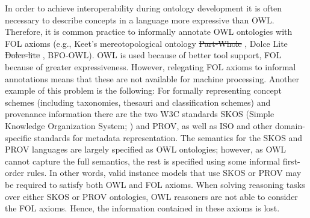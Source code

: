 \documentclass[10pt,fleqn,final]{scrreprt}
\newcommand{\noterefname}{note}
\newcommand{\nref}[1]{\noterefname~\ref{#1}}
\renewcommand{\nref}[1]{\ref{nref-#1}} %
\providecommand{\DIFadd}[1]{{\protect\color{blue}\uwave{#1}}} %
\providecommand{\DIFdel}[1]{{\protect\color{red}\sout{#1}}}                      %
\providecommand{\DIFaddbegin}{} %
\providecommand{\DIFaddend}{} %
\providecommand{\DIFdelbegin}{} %
\providecommand{\DIFdelend}{} %
\begin{document}
In order to achieve interoperability during ontology development it is often necessary to describe 
concepts in a language more expressive than OWL.  Therefore, it is common practice to informally 
annotate OWL ontologies with FOL axioms (e.g., Keet's mereotopological ontology \DIFdelbegin %
\DIFdel{Part-Whole}%
\DIFdelend \DIFaddbegin \DIFadd{\mbox{%
\cite{KeetEtAl12}
}%
}\DIFaddend , 
Dolce Lite \DIFdelbegin %
\DIFdel{Dolce-lite}%
\DIFdelend \DIFaddbegin \DIFadd{\mbox{%
\cite{dolce-web}
}%
}\DIFaddend , BFO-OWL). OWL is used because of better tool support, FOL because of 
greater expressiveness. However, relegating FOL axioms to  informal annotations means that these 
are not available for machine processing.  Another example of this problem is the following: For 
formally representing concept schemes (including taxonomies, thesauri and classification schemes) 
and provenance information there are the two W3C standards SKOS (Simple Knowledge Organization 
System; \DIFdelbegin %
\DIFdelend \DIFaddbegin \DIFadd{\nref{SKOS}}\DIFaddend ) and PROV, as well as ISO and other domain-specific  standards for 
metadata representation. The semantics for the SKOS and PROV languages are largely specified as OWL 
ontologies; however, as OWL cannot capture the full semantics, the rest is specified using some 
informal first-order rules. In other words, valid instance models that use SKOS or PROV may be 
required to satisfy both OWL and FOL axioms. When solving reasoning tasks over either SKOS or PROV 
ontologies, OWL reasoners are not able to consider the  FOL axioms. Hence, the information 
contained in these axioms is lost.
\end{document}
